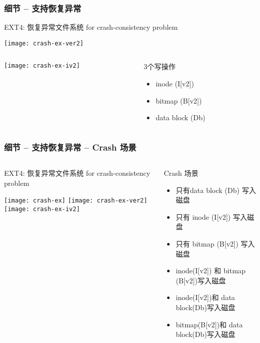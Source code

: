 \begin{frame}[fragile]
	\frametitle{细节 -- 支持恢复异常}
	EXT4: 恢复异常文件系统 for crash-consistency problem
	
	\centering
	\texttt{[image: crash-ex-ver2]}
	
	
		\begin{columns}
		\begin{column}{.5\textwidth}
			
		
			\centering
	\texttt{[image: crash-ex-iv2]}
			
		\end{column}
		\pause
		\begin{column}{.5\textwidth}			
		3个写操作
		\begin{itemize}
	\item inode (I[v2]) 
	\item bitmap (B[v2])
	\item data block (Db)
\end{itemize}
			
		\end{column}
	\end{columns}
	
\end{frame}



\begin{frame}[fragile]
	\frametitle{细节 -- 支持恢复异常 -- Crash 场景}
	\begin{columns}
	\begin{column}{.4\textwidth}
	EXT4: 恢复异常文件系统 for crash-consistency problem
	
	\centering
	\texttt{[image: crash-ex]}
	\texttt{[image: crash-ex-ver2]}
	\texttt{[image: crash-ex-iv2]}	
	\end{column}
	\pause
	\begin{column}{.6\textwidth}			
			Crash 场景
			\begin{itemize}
				\item 只有data block (Db) 写入磁盘
				\item 只有 inode (I[v2])  写入磁盘
				\item 只有 bitmap (B[v2])  写入磁盘
				\pause
				\item inode(I[v2]) 和 bitmap (B[v2])写入磁盘
				\item inode(I[v2])和 data block(Db)写入磁盘
				\item bitmap(B[v2])和 data block(Db)写入磁盘
			\end{itemize}
			
		\end{column}
	\end{columns}
	
\end{frame}


